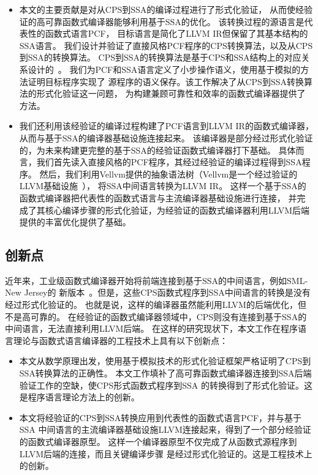 \begin{itemize}
    \item
    本文的主要贡献是对从CPS到SSA的编译过程进行了形式化验证，
    从而使经验证的高可靠函数式编译器能够利用基于SSA的优化。
    该转换过程的源语言是代表性的函数式语言PCF，
    目标语言是简化了LLVM IR但保留了其基本结构的SSA语言。
    我们设计并验证了直接风格PCF程序的CPS转换算法，以及从CPS到SSA的转换算法。
    CPS到SSA的转换算法是基于CPS和SSA结构上的对应关系设计的~\cite{appel1998ssa,kelsey1995correspondence}。
    我们为PCF和SSA语言定义了小步操作语义，使用基于模拟的方法证明目标程序实现了
    源程序的语义保存。该工作解决了从CPS到SSA转换算法的形式化验证这一问题，
    为构建兼顾可靠性和效率的函数式编译器提供了方法。
    
    \item 
    我们还利用该经验证的编译过程构建了PCF语言到LLVM IR的函数式编译器，
    从而与基于SSA的编译器基础设施连接起来。
    该编译器是部分经过形式化验证的，为未来构建更完整的基于SSA的经验证函数式编译器打下基础。
    具体而言，我们首先读入直接风格的PCF程序，其经过经验证的编译过程得到SSA程序。
    然后，我们利用Vellvm提供的抽象语法树（Vellvm是一个经过验证的LLVM基础设施~\cite{vellvm2012,zakowski2021modular}），
    将SSA中间语言转换为LLVM IR。
    这样一个基于SSA的函数式编译器把代表性的函数式语言与主流编译器基础设施进行连接，
    并完成了其核心编译步骤的形式化验证，为经验证的函数式编译器利用LLVM后端提供的丰富优化提供了基础。
    
\end{itemize}

\subsection{创新点}

近年来，工业级函数式编译器开始将前端连接到基于SSA的中间语言，例如SML-New Jersey的
新版本~\cite{farvardin2020new}。但是，这些CPS函数式程序到SSA中间语言的转换是没有经过形式化验证的。
也就是说，这样的编译器虽然能利用LLVM的后端优化，但不是高可靠的。
在经验证的函数式编译器领域中，CPS则没有连接到基于SSA的中间语言，无法直接利用LLVM后端。
在这样的研究现状下，本文工作在程序语言理论与函数式语言编译器的工程技术上具有以下创新点：

\begin{itemize}
    \item 本文从数学原理出发，使用基于模拟技术的形式化验证框架严格证明了CPS到SSA转换算法的正确性。
        本文工作填补了高可靠函数式编译器连接到SSA后端验证工作的空缺，使CPS形式函数式程序到SSA
        的转换得到了形式化验证。这是程序语言理论方法上的创新。
    \item 本文将经验证的CPS到SSA转换应用到代表性的函数式语言PCF，并与基于SSA
        中间语言的主流编译器基础设施LLVM连接起来，得到了一个部分经验证的函数式编译器原型。
        这样一个编译器原型不仅完成了从函数式源程序到LLVM后端的连接，而且关键编译步骤
        是经过形式化验证的。这是工程技术上的创新。
\end{itemize}

